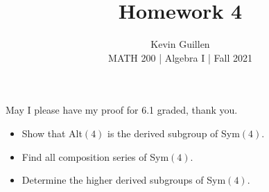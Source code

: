 \documentclass[11pt]{article}
\newenvironment{problem}[2][Problem\!]{\begin{trivlist}
\item[\hskip \labelsep {\bfseries #1}\hskip \labelsep {\bfseries #2}]}{\end{trivlist}}
\begin{document}
 
\title{Homework 4}
\author{Kevin Guillen\\[0.5em]
MATH 200 | Algebra I | Fall 2021}
\date{} 
\maketitle

May I please have my proof for 6.1 graded, thank you.

\begin{tcolorbox}
    \begin{problem}{4.1}
        \begin{itemize}
            \item[(a)] Show that Alt$(4)$ is the derived subgroup of Sym$(4)$.
            \item[(b)] Find all composition series of Sym$(4)$.
            \item[(c)] Determine the higher derived subgroups of Sym$(4)$.
        \end{itemize}
    \end{problem}    
\end{tcolorbox}
\end{document}
